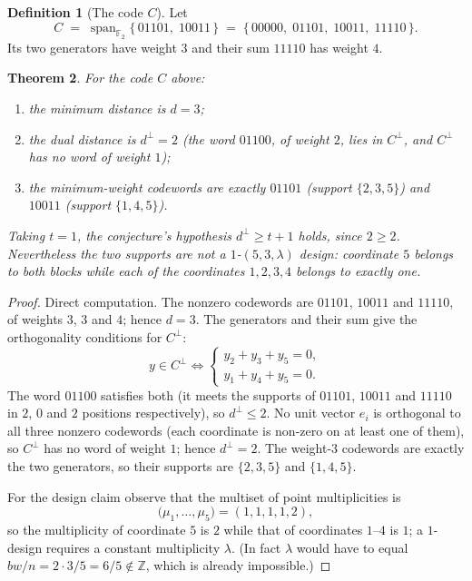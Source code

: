 \documentclass[11pt]{article}
\newtheorem{theorem}{Theorem}
\theoremstyle{definition}
\newtheorem{definition}[theorem]{Definition}
\theoremstyle{remark}
\newcommand{\F}{\mathbb{F}}
\newcommand{\dperp}{d^{\perp}}
\begin{document}
\begin{definition}[The code $C$]
Let
\[
C \;=\; \operatorname{span}_{\F_2}\{\,01101,\; 10011\,\}
\;=\; \{\,00000,\; 01101,\; 10011,\; 11110\,\}.
\]
Its two generators have weight $3$ and their sum $11110$ has weight $4$.
\end{definition}

\begin{theorem}\label{thm:main}
For the code $C$ above:
\begin{enumerate}
\item[(i)] the minimum distance is $d = 3$;
\item[(ii)] the dual distance is $\dperp = 2$ (the word $01100$, of weight $2$,
      lies in $C^{\perp}$, and $C^{\perp}$ has no word of weight $1$);
\item[(iii)] the minimum-weight codewords are exactly $01101$ (support
      $\{2,3,5\}$) and $10011$ (support $\{1,4,5\}$).
\end{enumerate}
Taking $t = 1$, the conjecture's hypothesis $\dperp \ge t+1$ holds, since
$2 \ge 2$. Nevertheless the two supports are \emph{not} a $1$-$(5,3,\lambda)$
design: coordinate $5$ belongs to both blocks while each of the coordinates
$1,2,3,4$ belongs to exactly one.
\end{theorem}

\begin{proof}
Direct computation. The nonzero codewords are $01101$, $10011$ and
$11110$, of weights $3$, $3$ and $4$; hence $d = 3$. The generators and their
sum give the orthogonality conditions for $C^{\perp}$:
\[
y \in C^{\perp} \iff
\begin{cases}
y_2 + y_3 + y_5 = 0,\\
y_1 + y_4 + y_5 = 0.
\end{cases}
\]
The word $01100$ satisfies both (it meets the supports of $01101$, $10011$ and
$11110$ in $2$, $0$ and $2$ positions respectively), so $d^{\perp} \le 2$. No
unit vector $e_i$ is orthogonal to all three nonzero codewords (each coordinate
is non-zero on at least one of them), so $C^{\perp}$ has no word of weight $1$;
hence $\dperp = 2$. The weight-$3$ codewords are exactly the two generators, so
their supports are $\{2,3,5\}$ and $\{1,4,5\}$.

For the design claim observe that the multiset of point multiplicities is
\[
\bigl(\mu_1,\dots,\mu_5\bigr) = (1,1,1,1,2),
\]
so the multiplicity of coordinate $5$ is $2$ while that of coordinates
$1$--$4$ is $1$; a $1$-design requires a constant multiplicity $\lambda$. (In
fact $\lambda$ would have to equal $bw/n = 2\cdot 3/5 = 6/5 \notin \mathbb{Z}$,
which is already impossible.)
\end{proof}
\end{document}

